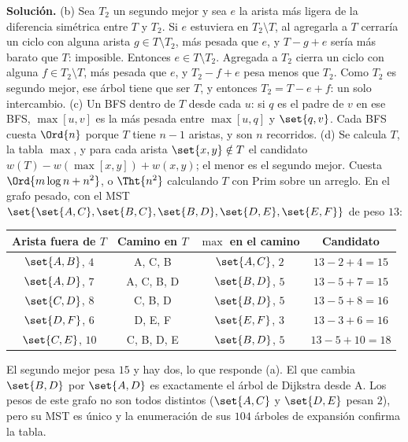 \documentclass[11pt,letterpaper]{article}
\begin{document}
\textbf{Solución.} (b) Sea $T_2$ un segundo mejor y sea $e$ la arista
más ligera de la diferencia simétrica entre $T$ y $T_2$. Si $e$
estuviera en $T_2 \setminus T$, al agregarla a $T$ cerraría un ciclo
con alguna arista $g \in T \setminus T_2$, más pesada que $e$, y
$T - g + e$ sería más barato que $T$: imposible. Entonces
$e \in T \setminus T_2$. Agregada a $T_2$ cierra un ciclo con alguna
$f \in T_2 \setminus T$, más pesada que $e$, y $T_2 - f + e$ pesa
menos que $T_2$. Como $T_2$ es segundo mejor, ese árbol tiene que ser
$T$, y entonces $T_2 = T - e + f$: un solo intercambio. (c) Un BFS
dentro de $T$ desde cada $u$: si $q$ es el padre de $v$ en ese BFS,
$\max[u, v]$ es la más pesada entre $\max[u, q]$ y $\set{q, v}$. Cada
BFS cuesta $\Ord{n}$ porque $T$ tiene $n - 1$ aristas, y son $n$
recorridos. (d) Se calcula $T$, la tabla $\max$, y para cada arista
$\set{x, y} \notin T$ el candidato
$w(T) - w(\max[x, y]) + w(x, y)$; el menor es el segundo mejor. Cuesta
$\Ord{m \log n + n^2}$, o $\Tht{n^2}$ calculando $T$ con Prim sobre
un arreglo. En el grafo pesado, con el MST
$\set{\set{A,C}, \set{B,C}, \set{B,D}, \set{D,E}, \set{E,F}}$ de peso
$13$:
\begin{center}
\small
\begin{tabular}{cccc}
  \toprule
  \textbf{Arista fuera de $T$} & \textbf{Camino en $T$}
    & \textbf{$\max$ en el camino} & \textbf{Candidato} \\
  \midrule
  $\set{A,B}$, $4$ & A, C, B & $\set{A,C}$, $2$ & $13 - 2 + 4 = 15$ \\
  $\set{A,D}$, $7$ & A, C, B, D & $\set{B,D}$, $5$
    & $13 - 5 + 7 = 15$ \\
  $\set{C,D}$, $8$ & C, B, D & $\set{B,D}$, $5$ & $13 - 5 + 8 = 16$ \\
  $\set{D,F}$, $6$ & D, E, F & $\set{E,F}$, $3$ & $13 - 3 + 6 = 16$ \\
  $\set{C,E}$, $10$ & C, B, D, E & $\set{B,D}$, $5$
    & $13 - 5 + 10 = 18$ \\
  \bottomrule
\end{tabular}
\end{center}
El segundo mejor pesa $15$ y hay dos, lo que responde (a). El que
cambia $\set{B,D}$ por $\set{A,D}$ es exactamente el árbol de Dijkstra
desde A. Los pesos de este grafo no son todos distintos ($\set{A,C}$ y
$\set{D,E}$ pesan $2$), pero su MST es único y la enumeración de sus
$104$ árboles de expansión confirma la tabla.
\end{document}
